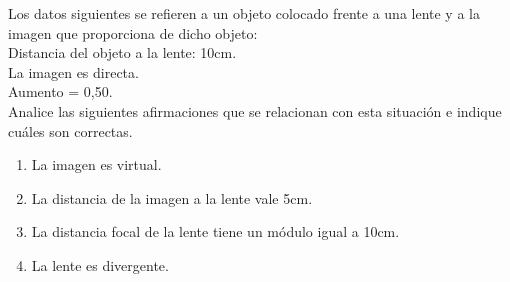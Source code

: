 
Los datos siguientes se refieren a un objeto colocado frente a una lente y a la imagen que proporciona de dicho objeto:\\
\hspace*{0.5cm} Distancia del objeto a la lente: 10cm.\\
\hspace*{0.5cm} La imagen es directa.\\
\hspace*{0.5cm} Aumento = 0,50.\\
Analice las siguientes afirmaciones que se relacionan con esta situación e indique cuáles son correctas.
\begin{enumerate}
    \item La imagen es virtual.
    \item La distancia de la imagen a la lente vale 5cm.
    \item La distancia focal de la lente tiene un módulo igual a 10cm.
    \item La lente es divergente.
\end{enumerate}